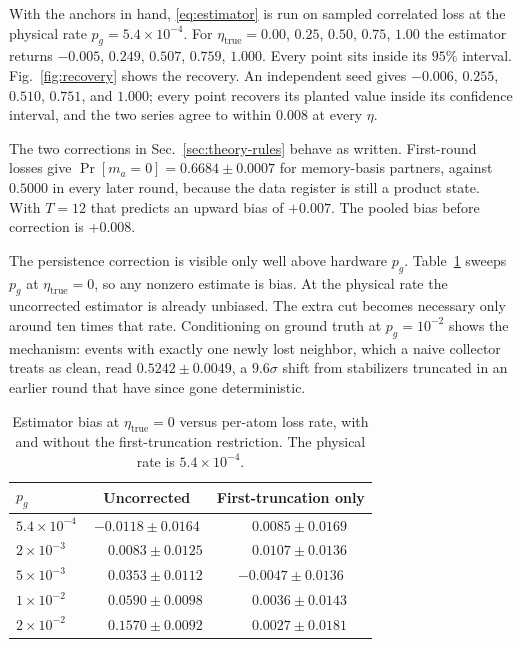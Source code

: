 \documentclass{ieeeaccess}
\begin{document}
With the anchors in hand, \eqref{eq:estimator} is run on sampled correlated
loss at the physical rate $p_g=5.4\times10^{-4}$. For
$\eta_{\text{true}}=0.00$, $0.25$, $0.50$, $0.75$, $1.00$ the estimator
returns $-0.005$, $0.249$, $0.507$, $0.759$, $1.000$. Every point sits inside
its $95\%$ interval. Fig.~\ref{fig:recovery} shows the recovery. An independent seed gives $-0.006$, $0.255$, $0.510$, $0.751$, and $1.000$;
every point recovers its planted value inside its confidence interval, and the
two series agree to within $0.008$ at every $\eta$.

The two corrections in Sec.~\ref{sec:theory-rules} behave as written.
First-round losses give $\Pr[m_a=0]=0.6684\pm 0.0007$ for memory-basis
partners, against $0.5000$ in every later round, because the data register is
still a product state. With $T=12$ that predicts an upward bias of $+0.007$.
The pooled bias before correction is $+0.008$.

The persistence correction is visible only well above hardware $p_g$.
Table~\ref{tab:pgsweep} sweeps $p_g$ at $\eta_{\text{true}}=0$, so any nonzero
estimate is bias. At the physical rate the uncorrected estimator is already
unbiased. The extra cut becomes necessary only around ten times that rate.
Conditioning on ground truth at $p_g=10^{-2}$ shows the mechanism: events with
exactly one newly lost neighbor, which a naive collector treats as clean, read
$0.5242\pm 0.0049$, a $9.6\sigma$ shift from stabilizers truncated in an
earlier round that have since gone deterministic.

\begin{table}[!t]
\caption{Estimator bias at $\eta_{\text{true}}=0$ versus per-atom loss rate,
with and without the first-truncation restriction. The physical rate is
$5.4\times10^{-4}$.}
\label{tab:pgsweep}
\centering
\begin{tabular}{@{}lcc@{}}
\toprule
$p_g$ & Uncorrected & First-truncation only \\
\midrule
$5.4\times10^{-4}$ & $-0.0118 \pm 0.0164$ & $\phantom{-}0.0085 \pm 0.0169$ \\
$2\times10^{-3}$ & $\phantom{-}0.0083 \pm 0.0125$ & $\phantom{-}0.0107 \pm 0.0136$ \\
$5\times10^{-3}$ & $\phantom{-}0.0353 \pm 0.0112$ & $-0.0047 \pm 0.0136$ \\
$1\times10^{-2}$ & $\phantom{-}0.0590 \pm 0.0098$ & $\phantom{-}0.0036 \pm 0.0143$ \\
$2\times10^{-2}$ & $\phantom{-}0.1570 \pm 0.0092$ & $\phantom{-}0.0027 \pm 0.0181$ \\
\bottomrule
\end{tabular}
\end{table}
\end{document}
